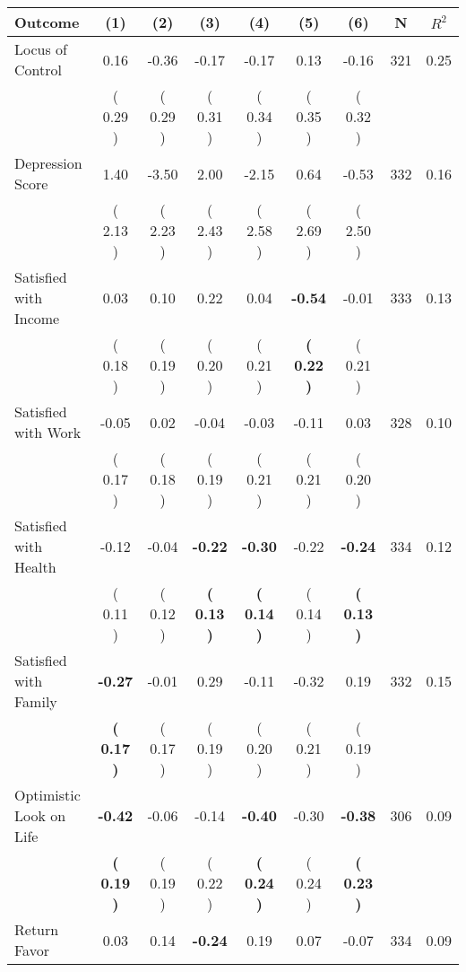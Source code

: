 \begin{tabular}{lcccccccc}
\toprule
 \textbf{Outcome} & \textbf{(1)} & \textbf{(2)} & \textbf{(3)} & \textbf{(4)} & \textbf{(5)} & \textbf{(6)} & \textbf{N} & \textbf{$ R^2$} \\
\midrule
Locus of Control &      0.16 &     -0.36 &     -0.17 &     -0.17 &      0.13 &     -0.16 & 321 &       0.25 \\ 
 & (     0.29 ) & (     0.29 ) & (     0.31 ) & (     0.34 ) & (     0.35 ) & (     0.32 ) & \\
Depression Score &      1.40 &     -3.50 &      2.00 &     -2.15 &      0.64 &     -0.53 & 332 &       0.16 \\ 
 & (     2.13 ) & (     2.23 ) & (     2.43 ) & (     2.58 ) & (     2.69 ) & (     2.50 ) & \\
Satisfied with Income &      0.03 &      0.10 &      0.22 &      0.04 & \textbf{    -0.54} &     -0.01 & 333 &       0.13 \\ 
 & (     0.18 ) & (     0.19 ) & (     0.20 ) & (     0.21 ) & \textbf{(     0.22 )} & (     0.21 ) & \\
Satisfied with Work &     -0.05 &      0.02 &     -0.04 &     -0.03 &     -0.11 &      0.03 & 328 &       0.10 \\ 
 & (     0.17 ) & (     0.18 ) & (     0.19 ) & (     0.21 ) & (     0.21 ) & (     0.20 ) & \\
Satisfied with Health &     -0.12 &     -0.04 & \textbf{    -0.22} & \textbf{    -0.30} &     -0.22 & \textbf{    -0.24} & 334 &       0.12 \\ 
 & (     0.11 ) & (     0.12 ) & \textbf{(     0.13 )} & \textbf{(     0.14 )} & (     0.14 ) & \textbf{(     0.13 )} & \\
Satisfied with Family & \textbf{    -0.27} &     -0.01 &      0.29 &     -0.11 &     -0.32 &      0.19 & 332 &       0.15 \\ 
 & \textbf{(     0.17 )} & (     0.17 ) & (     0.19 ) & (     0.20 ) & (     0.21 ) & (     0.19 ) & \\
Optimistic Look on Life & \textbf{    -0.42} &     -0.06 &     -0.14 & \textbf{    -0.40} &     -0.30 & \textbf{    -0.38} & 306 &       0.09 \\ 
 & \textbf{(     0.19 )} & (     0.19 ) & (     0.22 ) & \textbf{(     0.24 )} & (     0.24 ) & \textbf{(     0.23 )} & \\
Return Favor &      0.03 &      0.14 & \textbf{    -0.24} &      0.19 &      0.07 &     -0.07 & 334 &       0.09 \\ 

\end{tabular}
